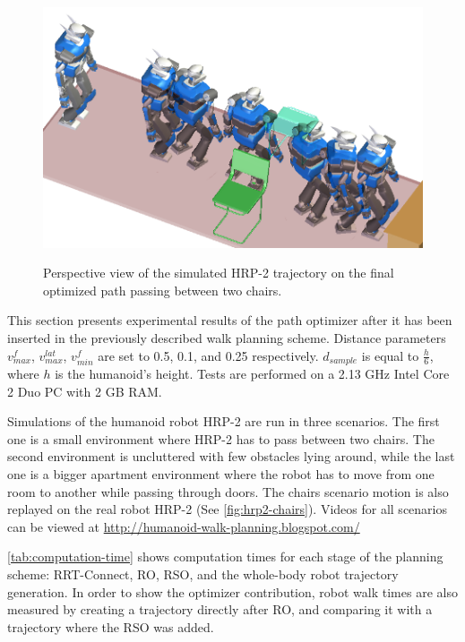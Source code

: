 \begin{figure}
  \centering
      {\includegraphics[width = \linewidth]
        {src/chap1-path-optimization/chairs-hash-optim-perspective-hrp2.png}}
      \caption{Perspective view of the simulated HRP-2 trajectory on
        the final optimized path passing between two chairs.}
      \label{fig:chairs-hash-optim-perspective-hrp2}
\end{figure}

This section presents experimental results of the path
optimizer after it has been inserted in the previously described walk
planning scheme. Distance parameters $v_{max}^f$,
$v_{max}^{lat}$, $v_{min}^f$ are set to 0.5, 0.1, and 0.25
respectively. $d_{sample}$ is equal to $\frac{h}{6}$, where $h$
is the humanoid's height.  Tests are performed on a 2.13 GHz Intel Core
2 Duo PC with 2 GB RAM.

Simulations of the humanoid robot HRP-2 are run in three scenarios.
The first one is a small environment where HRP-2 has to pass between
two chairs. The second environment is uncluttered with few obstacles
lying around, while the last one is a bigger apartment environment
where the robot has to move from one room to another while passing
through doors. The chairs scenario motion is also replayed on the real
robot HRP-2 (See \autoref{fig:hrp2-chairs}). Videos for all scenarios
can be viewed at \url{http://humanoid-walk-planning.blogspot.com/}

\autoref{tab:computation-time} shows computation times for each stage
of the planning scheme: RRT-Connect, RO, RSO, and the whole-body robot
trajectory generation. In order to show the optimizer contribution,
robot walk times are also measured by creating a trajectory directly
after RO, and comparing it with a trajectory where the RSO was added.

